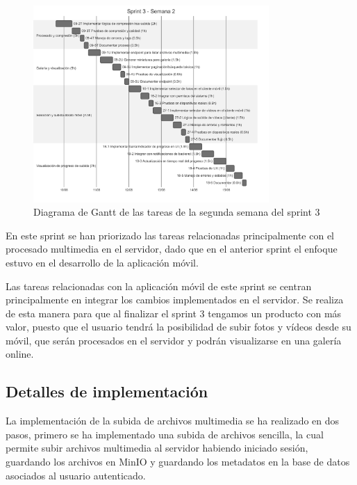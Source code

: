 \begin{figure}[H]
    \begin{center}
        \includegraphics[width=0.8\textwidth]{assets/sprint3/week2-gantt.png}
    \end{center}
    \caption{Diagrama de Gantt de las tareas de la segunda semana del sprint 3}\label{fig:gantt-sprint3-week2}
\end{figure}

En este sprint se han priorizado las tareas relacionadas principalmente con el procesado multimedia en el servidor, dado que en el anterior sprint el enfoque estuvo en el desarrollo de la aplicación móvil.

Las tareas relacionadas con la aplicación móvil de este sprint se centran principalmente en integrar los cambios implementados en el servidor.
Se realiza de esta manera para que al finalizar el sprint 3 tengamos un producto con más valor, puesto que el usuario tendrá la posibilidad de subir fotos y vídeos desde su móvil, que serán procesados en el servidor y podrán visualizarse en una galería online.

\subsection{Detalles de implementación}
La implementación de la subida de archivos multimedia se ha realizado en dos pasos, primero se ha implementado una subida de archivos sencilla, la cual permite subir archivos multimedia al servidor habiendo iniciado sesión, guardando los archivos en MinIO y guardando los metadatos en la base de datos asociados al usuario autenticado.

